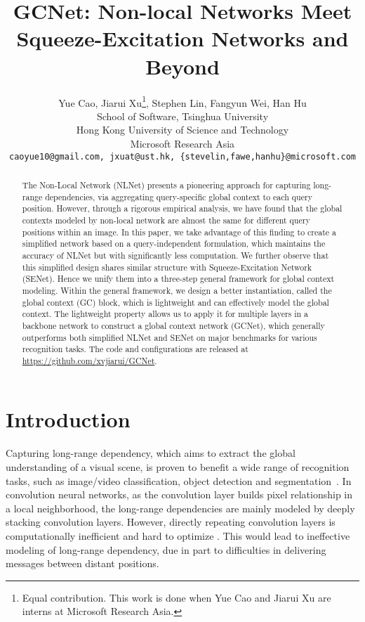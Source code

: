 \documentclass[10pt,twocolumn,letterpaper]{article}
\begin{document}
\title{GCNet: Non-local Networks Meet Squeeze-Excitation Networks and Beyond}

\author{
    Yue Cao, Jiarui Xu\thanks{Equal contribution. This work is done when Yue Cao and Jiarui Xu are interns at Microsoft Research Asia.}, Stephen Lin, Fangyun Wei, Han Hu\\
    School of Software, Tsinghua University\\
    Hong Kong University of Science and Technology\\
    Microsoft Research Asia\\
    {\tt \small caoyue10@gmail.com, jxuat@ust.hk, \{stevelin,fawe,hanhu\}@microsoft.com}
}

\maketitle



\begin{abstract}
The Non-Local Network (NLNet) presents a pioneering approach for capturing long-range dependencies, via aggregating query-specific global context to each query position. However, through a rigorous empirical analysis, we have found that the global contexts modeled by non-local network are almost the same for different query positions within an image. In this paper, we take advantage of this finding to create a simplified network based on a query-independent formulation, which maintains the accuracy of NLNet but with significantly less computation. We further observe that this simplified design shares similar structure with Squeeze-Excitation Network (SENet). Hence we unify them into a three-step general framework for global context modeling. Within the general framework, we design a better instantiation, called the global context (GC) block, which is lightweight and can effectively model the global context. The lightweight property allows us to apply it for multiple layers in a backbone network to construct a global context network (GCNet), which generally outperforms both simplified NLNet and SENet on major benchmarks for various recognition tasks.
The code and configurations are released at \url{https://github.com/xvjiarui/GCNet}.
\end{abstract}

\section{Introduction} 
Capturing long-range dependency, which aims to extract the global understanding of a visual scene, is proven to benefit a wide range of recognition tasks, such as image/video classification, object detection and segmentation~\cite{wang2017non,hu2018relation,zhang2018context,hu2018senet}.
In convolution neural networks, as the convolution layer builds pixel relationship in a local neighborhood, the long-range dependencies are mainly modeled by deeply stacking convolution layers.
However, directly repeating convolution layers is computationally inefficient and hard to optimize \cite{wang2017non}.
This would lead to ineffective modeling of long-range dependency, due in part to difficulties in delivering messages between distant positions.
\end{document}
